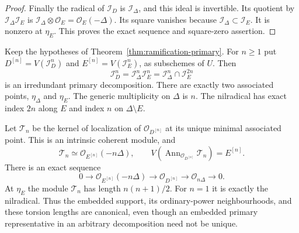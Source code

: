 \begin{proof}
Finally the radical of $\mathcal I_D$ is $\mathcal I_\Delta$,
and this ideal is invertible. Its quotient by
$\mathcal I_\Delta\mathcal I_E$ is
$\mathcal I_\Delta\otimes\mathcal O_E=\mathcal O_E(-\Delta)$.
Its square vanishes because $\mathcal I_\Delta\subset\mathcal I_E$.
It is nonzero at $\eta_E$. This proves the exact sequence and
square-zero assertion.
\end{proof}

\begin{theorem}
\label{thm:primary-powers-intrinsic}
Keep the hypotheses of Theorem~\ref{thm:ramification-primary}.
For $n\ge1$ put $D^{[n]}=V(\mathcal I_D^n)$ and
$E^{[n]}=V(\mathcal I_E^n)$, as subschemes of $U$. Then
\begin{equation}\label{eq:ramification-all-powers}
 \mathcal I_D^n=\mathcal I_\Delta^n\mathcal I_E^n
               =\mathcal I_\Delta^n\cap\mathcal I_E^{2n}
\end{equation}
is an irredundant primary decomposition. There are exactly two
associated points, $\eta_\Delta$ and $\eta_E$. The generic
multiplicity on $\Delta$ is $n$. The nilradical has exact index
$2n$ along $E$ and index $n$ on $\Delta\setminus E$.

Let $\mathcal T_n$ be the kernel of localization of
$\mathcal O_{D^{[n]}}$ at its unique minimal associated point.
This is an intrinsic coherent module, and
\begin{equation}\label{eq:canonical-embedded-torsion}
 \mathcal T_n\simeq\mathcal O_{E^{[n]}}(-n\Delta),\qquad
 V\!\left(\operatorname{Ann}_{\mathcal O_{D^{[n]}}}\mathcal T_n\right)
       =E^{[n]}.
\end{equation}
There is an exact sequence
\begin{equation}\label{eq:power-torsion-sequence}
 0\longrightarrow\mathcal O_{E^{[n]}}(-n\Delta)
 \longrightarrow\mathcal O_{D^{[n]}}
 \longrightarrow\mathcal O_{n\Delta}\longrightarrow0.
\end{equation}
At $\eta_E$ the module $\mathcal T_n$ has length $n(n+1)/2$.
For $n=1$ it is exactly the nilradical. Thus the embedded support,
its ordinary-power neighbourhoods, and these torsion lengths are
canonical, even though an embedded primary representative in an
arbitrary decomposition need not be unique.
\end{theorem}
